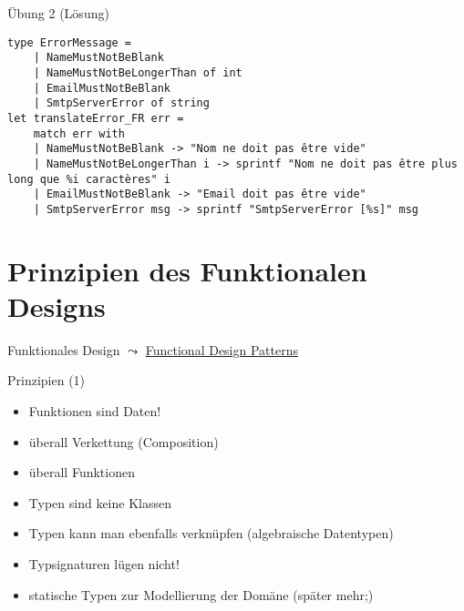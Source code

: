 \documentclass[t]{beamer}
\begin{document}
\begin{frame}[label={sec:orgd86303b},fragile]{Übung 2 (Lösung)}
 \begin{verbatim}
type ErrorMessage =
    | NameMustNotBeBlank
    | NameMustNotBeLongerThan of int
    | EmailMustNotBeBlank
    | SmtpServerError of string
let translateError_FR err =
    match err with
    | NameMustNotBeBlank -> "Nom ne doit pas être vide"
    | NameMustNotBeLongerThan i -> sprintf "Nom ne doit pas être plus long que %i caractères" i
    | EmailMustNotBeBlank -> "Email doit pas être vide"
    | SmtpServerError msg -> sprintf "SmtpServerError [%s]" msg
\end{verbatim}
\end{frame}

\section{Prinzipien des Funktionalen Designs }
\label{sec:orgdeacdc7}
\begin{frame}[label={sec:orgf536af6}]{Funktionales Design}
\(\leadsto\) \href{./3.1 Functional Design Patterns.pdf}{Functional Design Patterns}
\end{frame}

\begin{frame}[label={sec:orgcb5b294}]{Prinzipien (1)}
\begin{itemize}
\item Funktionen sind Daten!
\item überall Verkettung (Composition)
\item überall Funktionen
\item Typen sind keine Klassen
\item Typen kann man ebenfalls verknüpfen (algebraische Datentypen)
\item Typsignaturen lügen nicht!
\item statische Typen zur Modellierung der Domäne (später mehr;)
\end{itemize}
\end{frame}
\end{document}
